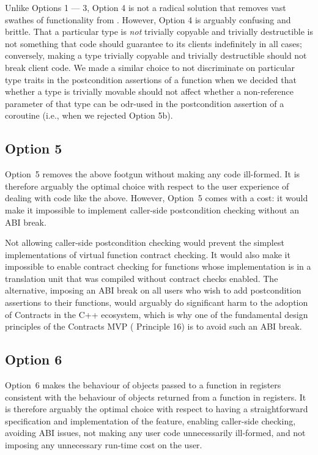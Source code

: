 Unlike Options 1 --- 3, Option 4 is not a radical solution that removes vast swathes of functionality from \cite{P2900R10}. However, Option 4 is arguably confusing and brittle. That a particular type is \emph{not} trivially copyable and trivially destructible is not something that code should guarantee to its clients indefinitely in all cases; conversely, making a type trivially copyable and trivially destructible should not break client code. We made a similar choice to not discriminate on particular type traits in the postcondition assertions of a function when we decided that whether a type is trivially movable should not affect whether a non-reference parameter of that type can be odr-used in the postcondition assertion of a coroutine (i.e., when we rejected \cite{P3387R0} Option 5b).

\subsection*{Option 5}

Option~5 removes the above footgun without making any code ill-formed. It is therefore arguably the optimal choice with respect to the user experience of dealing with code like the above. However, Option~5 comes with a cost: it would make it impossible to implement caller-side postcondition checking without an ABI break.

Not allowing caller-side postcondition checking would prevent the simplest implementations of virtual function contract checking.  It would also make it impossible to enable contract checking for functions whose implementation is in a translation unit that was compiled without contract checks enabled. The alternative, imposing an ABI break on all users who wish to add postcondition assertions to their functions, would arguably do significant harm to the adoption of Contracts in the C++ ecosystem, which is why one of the fundamental design principles of the Contracts MVP (\cite{P2900R10} Principle 16) is to avoid such an ABI break.

\subsection*{Option 6}

Option~6 makes the behaviour of objects passed to a function in registers consistent with the behaviour of objects returned from a function in registers. It is therefore arguably the optimal choice with respect to having a straightforward specification and implementation of the feature, enabling caller-side checking, avoiding ABI issues, not making any user code unnecessarily ill-formed, and not imposing any unnecessary run-time cost on the user.

